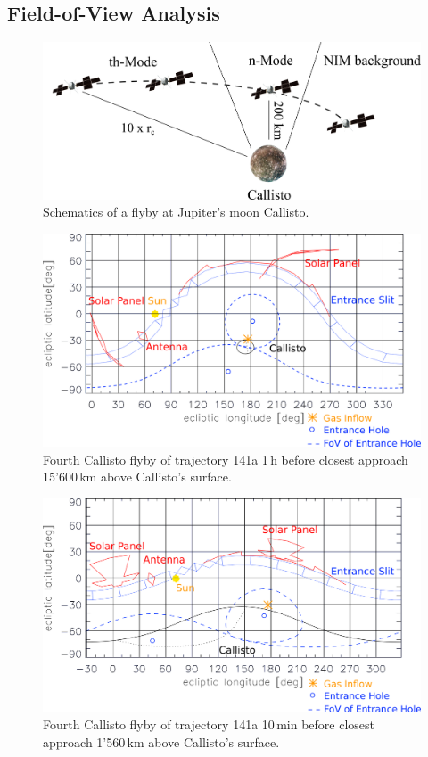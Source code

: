 	\subsection{Field-of-View Analysis }\label{subsubsec:Calfly}
	\begin{figure}[h!]
		\centering
		\includegraphics[width=.8\textwidth]{Bilder/Callisto_flyby_schematic.png}
		\caption{Schematics of a flyby at Jupiter's moon Callisto.}
		\label{fig:CalflybySchem}
	\end{figure}
	\begin{figure}[h!]
		\centering
		\includegraphics[width = .7\textwidth]{Bilder/NIM_pointing_2031JAN15185200.png}
		\caption{Fourth Callisto flyby of trajectory 141a \cite{SOC_Crema3p2} 1\,h before closest approach 15'600\,km above Callisto's surface.}
		\label{fig:FlybyCal1852}
	\end{figure}
	\begin{figure}[h!]
		\centering
		\includegraphics[width = .7\textwidth]{Bilder/NIM_pointing_2031JAN15194200.png}
		\caption{Fourth Callisto flyby of trajectory 141a \cite{SOC_Crema3p2} 10\,min before closest approach 1'560\,km above Callisto's surface.}
		\label{fig:FlybyCal1942}
	\end{figure}

